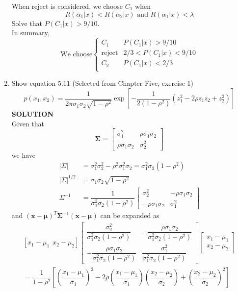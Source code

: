 \documentclass{article}
\begin{document}
\begin{enumerate}
When reject is considered, we choose $C_1$ when
$$
R(\alpha_1|x)<R(\alpha_2|x) \text{ and } R(\alpha_1|x)<\lambda
$$
Solve that $P(C_1|x)>9/10$.\\
In summary, 
$$
\text{We choose} \begin{cases}C_1 & P(C_1|x)>9/10\\ \text{reject} & 2/3<P(C_1|x)<9/10 \\ C_2 & P(C_1|x) < 2/3 \\
\end{cases}
$$
    \item Show equation $5.11$ (Selected from Chapter Five, exercise 1)
    $$
    p\left(x_1, x_2\right)=\frac{1}{2 \pi \sigma_1 \sigma_2 \sqrt{1-\rho^2}} \exp \left[-\frac{1}{2\left(1-\rho^2\right)}\left(z_1^2-2 \rho z_1 z_2+z_2^2\right)\right]
    $$
    \textbf{SOLUTION}\\
    Given that
$$
\boldsymbol{\Sigma}=\left[\begin{array}{cc}
\sigma_1^2 & \rho \sigma_1 \sigma_2 \\
\rho \sigma_1 \sigma_2 & \sigma_2^2
\end{array}\right]
$$
we have
$$
\begin{aligned}
|\Sigma| &=\sigma_1^2 \sigma_2^2-\rho^2 \sigma_1^2 \sigma_2=\sigma_1^2 \sigma_2\left(1-\rho^2\right) \\
|\Sigma|^{1 / 2} &=\sigma_1 \sigma_2 \sqrt{1-\rho^2} \\
\Sigma^{-1} &=\dfrac{1}{\sigma_1^2 \sigma_2\left(1-\rho^2\right)}\left[\begin{array}{cc}
\sigma_2^2 & -\rho \sigma_1 \sigma_2 \\
-\rho \sigma_1 \sigma_2 & \sigma_1^2
\end{array}\right]
\end{aligned}
$$
and $(\boldsymbol{x}-\boldsymbol{\mu})^T \boldsymbol{\Sigma}^{-1}(\boldsymbol{x}-\boldsymbol{\mu})$ can be expanded as
$$
\begin{array}{r}
{\left[x_1-\mu_1 ~~ x_2-\mu_2\right]\left[\begin{array}{cc}
\dfrac{\sigma_2^2}{\sigma_1^2 \sigma_2\left(1-\rho^2\right)} & -\dfrac{\rho \sigma_1 \sigma_2}{\sigma_1^2 \sigma_2\left(1-\rho^2\right)} \\
-\dfrac{\rho \sigma_1 \sigma_2}{\sigma_1^2 \sigma_2\left(1-\rho^2\right)} & \dfrac{\sigma_1^2}{\sigma_1^2 \sigma_2\left(1-\rho^2\right)}
\end{array}\right]\left[\begin{array}{c}
x_1-\mu_1 \\
x_2-\mu_2
\end{array}\right]} \\
=\dfrac{1}{1-\rho^2}\left[\left(\dfrac{x_1-\mu_1}{\sigma_1}\right)^2-2 \rho\left(\dfrac{x_1-\mu_1}{\sigma_1}\right)\left(\dfrac{x_2-\mu_2}{\sigma_2}\right)+\left(\dfrac{x_2-\mu_2}{\sigma_2}\right)^2\right]
\end{array}
$$





\end{enumerate}
\end{document}
